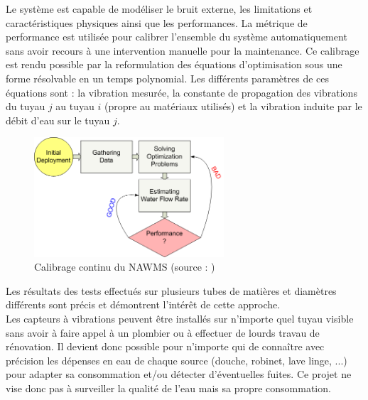 \documentclass[10pt, article]{llncs}
\begin{document}
		Le système est capable de modéliser le bruit externe, les limitations et caractéristiques physiques ainsi que les performances. La métrique de performance est utilisée pour calibrer l'ensemble du système automatiquement sans avoir recours à une intervention manuelle pour la maintenance. Ce calibrage est rendu possible par la reformulation des équations d'optimisation sous une forme résolvable en un temps polynomial. Les différents paramètres de ces équations sont : la vibration mesurée, la constante de propagation des vibrations du tuyau $j$ au tuyau $i$ (propre au matériaux utilisés) et la vibration induite par le débit d'eau sur le tuyau $j$.
		\begin{figure}
			\begin{center}
				\includegraphics[width=200pt]{img/nawms3.png}
			\end{center}
			\caption{Calibrage continu du NAWMS (source : \cite{kim_nawms:_2008})}
		\end{figure}
		Les résultats des tests effectués sur plusieurs tubes de matières et diamètres différents sont précis et démontrent l'intérêt de cette approche.\\
		Les capteurs à vibrations peuvent être installés sur n'importe quel tuyau visible sans avoir à faire appel à un plombier ou à effectuer de lourds travau de rénovation. Il devient donc possible pour n'importe qui de connaître avec précision les dépenses en eau de chaque source (douche, robinet, lave linge, ...) pour adapter sa consommation et/ou détecter d'éventuelles fuites.  Ce projet ne vise donc pas à surveiller la qualité de l'eau mais sa propre consommation.
	
\end{document}
